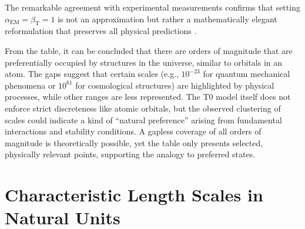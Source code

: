 \documentclass[12pt,a4paper]{article}
\newcommand{\alphaEM}{\alpha_{\text{EM}}}
\newcommand{\betaT}{\beta_{\text{T}}}
\begin{document}
The remarkable agreement with experimental measurements confirms that setting $\alphaEM = \betaT = 1$ is not an approximation but rather a mathematically elegant reformulation that preserves all physical predictions \cite{pascher_emergente_2025, pascher_alphabeta_2025}.

From the table, it can be concluded that there are orders of magnitude that are preferentially occupied by structures in the universe, similar to orbitals in an atom. The gaps suggest that certain scales (e.g., $10^{-23}$ for quantum mechanical phenomena or $10^{61}$ for cosmological structures) are highlighted by physical processes, while other ranges are less represented. The T0 model itself does not enforce strict discreteness like atomic orbitals, but the observed clustering of scales could indicate a kind of ``natural preference'' arising from fundamental interactions and stability conditions. A gapless coverage of all orders of magnitude is theoretically possible, yet the table only presents selected, physically relevant points, supporting the analogy to preferred states.
	\section{Characteristic Length Scales in Natural Units}
\end{document}
